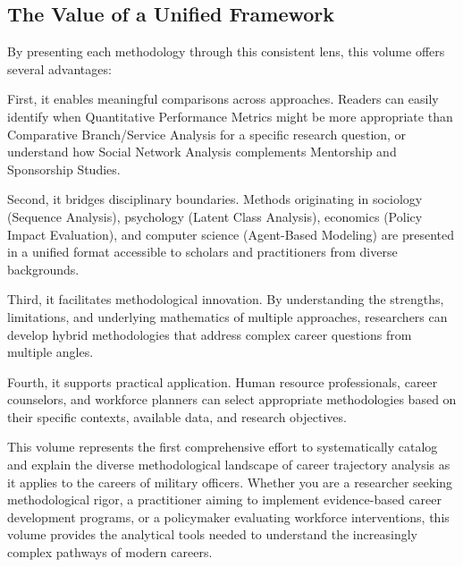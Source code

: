 \documentclass[./main.tex]{subfiles}
\begin{document}
\subsection{The Value of a Unified
Framework}\label{the-value-of-a-unified-framework}

By presenting each methodology through this consistent lens, this volume
offers several advantages:

First, it enables meaningful comparisons across approaches. Readers can
easily identify when Quantitative Performance Metrics might be more
appropriate than Comparative Branch/Service Analysis for a specific
research question, or understand how Social Network Analysis complements
Mentorship and Sponsorship Studies.

Second, it bridges disciplinary boundaries. Methods originating in
sociology (Sequence Analysis), psychology (Latent Class Analysis),
economics (Policy Impact Evaluation), and computer science (Agent-Based
Modeling) are presented in a unified format accessible to scholars and
practitioners from diverse backgrounds.

Third, it facilitates methodological innovation. By understanding the
strengths, limitations, and underlying mathematics of multiple
approaches, researchers can develop hybrid methodologies that address
complex career questions from multiple angles.

Fourth, it supports practical application. Human resource professionals,
career counselors, and workforce planners can select appropriate
methodologies based on their specific contexts, available data, and
research objectives.

This volume represents the first comprehensive effort to systematically
catalog and explain the diverse methodological landscape of career
trajectory analysis as it applies to the careers of military officers.
Whether you are a researcher seeking methodological rigor, a
practitioner aiming to implement evidence-based career development
programs, or a policymaker evaluating workforce interventions, this
volume provides the analytical tools needed to understand the
increasingly complex pathways of modern careers.
\end{document}
